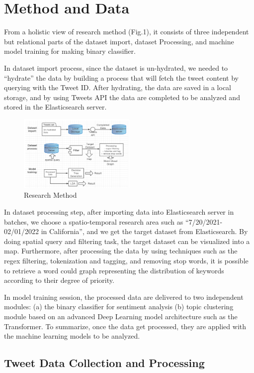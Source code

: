 \section{Method and Data}
From a holistic view of research method (Fig.1), it consists of three
independent but relational parts of the dataset import, dataset Processing,
and machine model training for making binary classifier.

In dataset import process, since the dataset is un-hydrated, we needed
to “hydrate” the data by building a process that will fetch the tweet content
by querying with the Tweet ID. After hydrating, the data are saved in a local
storage, and by using Tweets API the data are completed to be analyzed and
stored in the Elasticsearch server. 

\begin{figure}[h]
\centering
\includegraphics[width=0.5\textwidth]{imgs/Research_Method.png}
\caption{\label{fig:Research process}Research Method}
\end{figure}

In dataset processing step, after importing data into Elasticsearch server in
batches, we choose a spatio-temporal research area such
as “7/20/2021-02/01/2022 in California”, and we get the target dataset from
Elasticsearch. By doing spatial query and filtering task, the target dataset
can be visualized into a map. Furthermore, after processing the data by using
techniques such as the regex filtering, tokenization and tagging, and
removing stop words, it is possible to retrieve a word could graph
representing the distribution of keywords according to their degree of
priority.

In model training session, the processed data are delivered to two independent
modules: (a) the binary classifier for sentiment analysis (b) topic
clustering module based on an advanced Deep Learning model architecture such
as the Transformer. To summarize, once the data get processed, they are
applied with the machine learning models to be analyzed.

\subsection{Tweet Data Collection and Processing}
